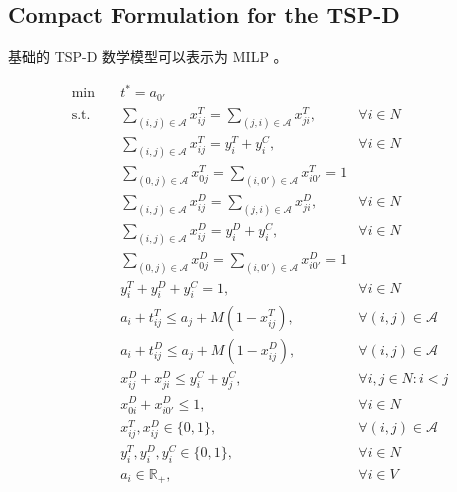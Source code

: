 \documentclass[fontset=none]{ctexart}
\begin{document}
\subsection{Compact Formulation for the TSP-D}
基础的 TSP-D 数学模型可以表示为 MILP 。
\begin{theorem}
{
\begin{align}
    \min \quad & t^* = a_{0'} \tag{1a} \label{eq:conv-obj}\\
    \text{s.t.} \quad & \sum_{(i,j)\in \mathcal{A}} x_{ij}^T = \sum_{(j,i)\in \mathcal{A}} x_{ji}^T, & \forall i \in N \tag{1b} \label{eq:conv-flow-T}\\
    \quad & \sum_{(i,j)\in \mathcal{A}} x_{ij}^T = y_i^T + y_i^C, & \forall i \in N \tag{1c} \label{eq:conv-sum-T}\\
    \quad & \sum_{(0,j)\in \mathcal{A}} x_{0j}^T = \sum_{(i,0')\in \mathcal{A}} x_{i0'}^T = 1 \tag{1d} \label{eq:conv-start-T}\\
    \quad & \sum_{(i,j)\in \mathcal{A}} x_{ij}^D = \sum_{(j,i)\in \mathcal{A}} x_{ji}^D, & \forall i \in N \tag{1e} \label{eq:conv-flow-D}\\
    \quad & \sum_{(i,j)\in \mathcal{A}} x_{ij}^D = y_i^D + y_i^C, & \forall i \in N \tag{1f} \label{eq:conv-sum-D}\\
    \quad & \sum_{(0,j)\in \mathcal{A}} x_{0j}^D = \sum_{(i,0')\in \mathcal{A}} x_{i0'}^D = 1 \tag{1g} \label{eq:conv-start-D}\\
    \quad & y_i^T + y_i^D + y_i^C = 1, & \forall i \in N \tag{1h} \label{eq:conv-y-sum}\\
    \quad & a_i + t_{ij}^T \leq a_j + M(1 - x_{ij}^T), & \forall (i,j) \in \mathcal{A} \tag{1i} \label{eq:conv-time-T}\\
    \quad & a_i + t_{ij}^D \leq a_j + M(1 - x_{ij}^D), & \forall (i,j) \in \mathcal{A} \tag{1j} \label{eq:conv-time-D}\\
    \quad & x_{ij}^D + x_{ji}^D \leq y_i^C + y_j^C, & \forall i,j \in N: i < j \tag{1k} \label{eq:conv-D-C}\\
    \quad & x_{0i}^D + x_{i0'}^D \leq 1, & \forall i \in N \tag{1l} \label{eq:conv-D-0}\\
    \quad & x_{ij}^T, x_{ij}^D \in \{0, 1\}, & \forall (i,j) \in \mathcal{A} \tag{1m} \label{eq:conv-x-bound}\\
    \quad & y_i^T, y_i^D, y_i^C \in \{0, 1\}, & \forall i \in N \tag{1n} \label{eq:conv-y-bound}\\
    \quad & a_i \in \mathbb{R}_+, & \forall i \in V \tag{1o} \label{eq:conv-a-bound}
\end{align}
}
\end{theorem}
\end{document}
